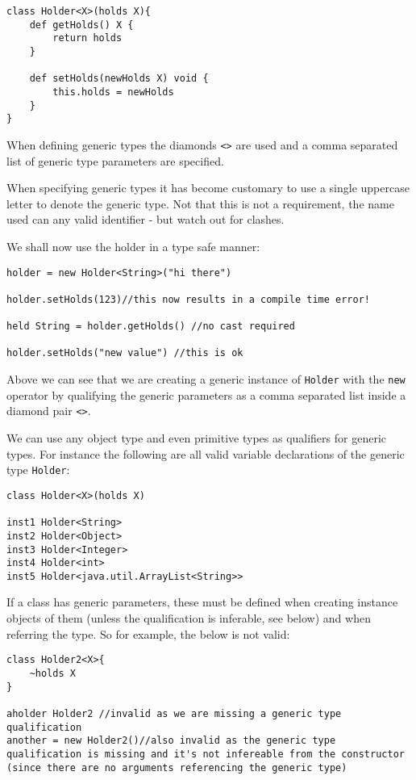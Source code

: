 \documentclass[conc-doc]{subfiles}
\begin{document}
\begin{lstlisting}
class Holder<X>(holds X){
	def getHolds() X {
		return holds
	}
	
	def setHolds(newHolds X) void {
		this.holds = newHolds
	}
}
\end{lstlisting}

When defining generic types the diamonds \lstinline{<>} are used and a comma separated list of generic type parameters are specified. 

When specifying generic types it has become customary to use a single uppercase letter to denote the generic type. Not that this is not a requirement, the name used can any valid identifier - but watch out for clashes.

We shall now use the holder in a type safe manner:

\begin{lstlisting}
holder = new Holder<String>("hi there")

holder.setHolds(123)//this now results in a compile time error!

held String = holder.getHolds() //no cast required

holder.setHolds("new value") //this is ok
\end{lstlisting}

Above we can see that we are creating a generic instance of \lstinline{Holder} with the \lstinline{new} operator by qualifying the generic parameters as a comma separated list inside a diamond pair \lstinline{<>}.

We can use any object type and even primitive types as qualifiers for generic types. For instance the following are all valid variable declarations of the generic type \lstinline{Holder}:

\begin{lstlisting}
class Holder<X>(holds X)

inst1 Holder<String>
inst2 Holder<Object>
inst3 Holder<Integer>
inst4 Holder<int>
inst5 Holder<java.util.ArrayList<String>>
\end{lstlisting}


If a class has generic parameters, these must be defined when creating instance objects of them (unless the qualification is inferable, see below) and when referring the type. So for example, the below is not valid:

\begin{lstlisting}
class Holder2<X>{
	~holds X
}

aholder Holder2 //invalid as we are missing a generic type qualification
another = new Holder2()//also invalid as the generic type qualification is missing and it's not infereable from the constructor (since there are no arguments referencing the generic type)
\end{lstlisting}
\end{document}
